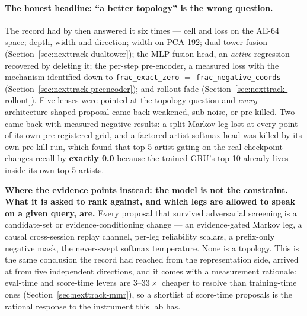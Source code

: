 \documentclass[11pt]{article}
\begin{document}
\paragraph{The honest headline: ``a better topology'' is the wrong question.} The
record had by then answered it six times --- cell and loss on the AE-64 space;
depth, width and direction; width on PCA-192; dual-tower fusion
(Section~\ref{sec:nexttrack-dualtower}); the MLP fusion head, an \emph{active} regression
recovered by deleting it; the per-step pre-encoder, a measured loss with the
mechanism identified down to \texttt{frac\_exact\_zero} $=$
\texttt{frac\_negative\_coords} (Section~\ref{sec:nexttrack-preencoder}); and rollout fade
(Section~\ref{sec:nexttrack-rollout}). Five lenses were pointed at the topology question
and \emph{every} architecture-shaped proposal came back weakened, sub-noise, or
pre-killed. Two came back with measured negative results: a split Markov leg lost
at every point of its own pre-registered grid, and a factored artist softmax head
was killed by its own pre-kill run, which found that top-5 artist gating on the
real checkpoint changes recall by \textbf{exactly \num{0.0}} because the trained
GRU's top-10 already lives inside its own top-5 artists.

\textbf{Where the evidence points instead: the model is not the constraint. What
it is asked to rank against, and which legs are allowed to speak on a given
query, are.} Every proposal that survived adversarial screening is a candidate-set
or evidence-conditioning change --- an evidence-gated Markov leg, a causal
cross-session replay channel, per-leg reliability scalars, a prefix-only negative
mask, the never-swept softmax temperature. None is a topology. This is the same
conclusion the record had reached from the representation side, arrived at from
five independent directions, and it comes with a measurement rationale: eval-time
and score-time levers are $\numrange{3}{33}\times$ cheaper to resolve than
training-time ones (Section~\ref{sec:nexttrack-mmr}), so a shortlist of score-time
proposals is the rational response to the instrument this lab has.
\end{document}
